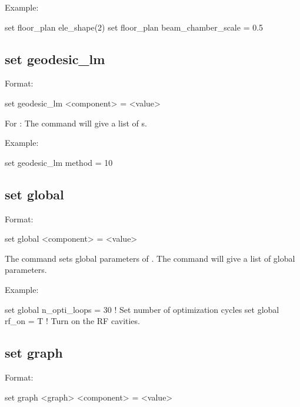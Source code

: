 {{Example:
\begin{example}
  set floor_plan ele_shape(2)%
  set floor_plan beam_chamber_scale = 0.5
\end{example}


\subsection{set geodesic_lm}
\label{s:set.geodesic.lm}

Format:
\begin{example}
  set geodesic_lm <component> = <value>
\end{example}

For : The  command will give a list of
s.

Example:
\begin{example}
  set geodesic_lm method = 10
\end{example}


\subsection{set global}
\label{s:set.global}

Format:
\begin{example}
  set global <component> = <value>
\end{example}

The  command sets global parameters of \tao.
The  command will give a list of global parameters.

Example:
\begin{example}
  set global n_opti_loops = 30  ! Set number of optimization cycles
  set global rf_on = T          ! Turn on the RF cavities.
\end{example}


\subsection{set graph}
\label{s:set.graph}

Format:
\begin{example}
  set graph <graph> <component> = <value>
\end{example}

}}
